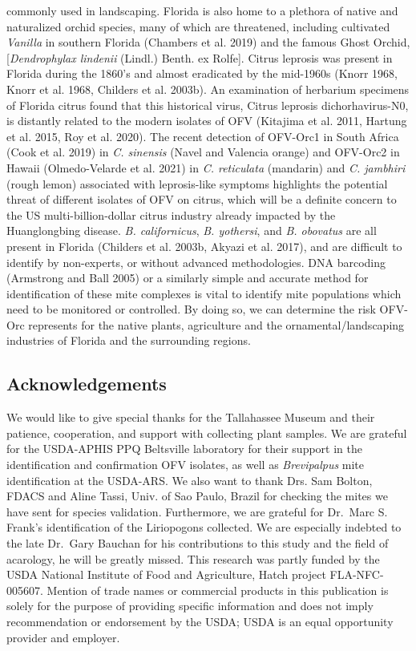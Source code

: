 \documentclass[12pt,final,CPage]{ufthesis}
\begin{document}
{commonly used in landscaping. Florida is also home to a plethora of native and naturalized orchid species, many of which are threatened, including cultivated \emph{Vanilla} in southern Florida (Chambers et al. 2019) and the famous Ghost Orchid, {[}\emph{Dendrophylax lindenii} (Lindl.) Benth. ex Rolfe{]}. Citrus leprosis was present in Florida during the 1860's and almost eradicated by the mid-1960s (Knorr 1968, Knorr et al. 1968, Childers et al. 2003b). An examination of herbarium specimens of Florida citrus found that this historical virus, Citrus leprosis dichorhavirus-N0, is distantly related to the modern isolates of OFV (Kitajima et al. 2011, Hartung et al. 2015, Roy et al. 2020). The recent detection of OFV-Orc1 in South Africa (Cook et al. 2019) in \emph{C. sinensis} (Navel and Valencia orange) and OFV-Orc2 in Hawaii (Olmedo-Velarde et al. 2021) in \emph{C. reticulata} (mandarin) and \emph{C. jambhiri} (rough lemon) associated with leprosis-like symptoms highlights the potential threat of different isolates of OFV on citrus, which will be a definite concern to the US multi-billion-dollar citrus industry already impacted by the Huanglongbing disease. \emph{B. californicus}, \emph{B. yothersi}, and \emph{B. obovatus} are all present in Florida (Childers et al. 2003b, Akyazi et al. 2017), and are difficult to identify by non-experts, or without advanced methodologies. DNA barcoding (Armstrong and Ball 2005) or a similarly simple and accurate method for identification of these mite complexes is vital to identify mite populations which need to be monitored or controlled. By doing so, we can determine the risk OFV-Orc represents for the native plants, agriculture and the ornamental/landscaping industries of Florida and the surrounding regions.

  \hypertarget{acknowledgements}{%
  \subsection{Acknowledgements}\label{acknowledgements}}

  We would like to give special thanks for the Tallahassee Museum and their patience, cooperation, and support with collecting plant samples. We are grateful for the USDA-APHIS PPQ Beltsville laboratory for their support in the identification and confirmation OFV isolates, as well as \emph{Brevipalpus} mite identification at the USDA-ARS. We also want to thank Drs. Sam Bolton, FDACS and Aline Tassi, Univ. of Sao Paulo, Brazil for checking the mites we have sent for species validation. Furthermore, we are grateful for Dr.~Marc S. Frank's identification of the Liriopogons collected. We are especially indebted to the late Dr.~Gary Bauchan for his contributions to this study and the field of acarology, he will be greatly missed. This research was partly funded by the USDA National Institute of Food and Agriculture, Hatch project FLA-NFC-005607. Mention of trade names or commercial products in this publication is solely for the purpose of providing specific information and does not imply recommendation or endorsement by the USDA; USDA is an equal opportunity provider and employer.

}
\end{document}
